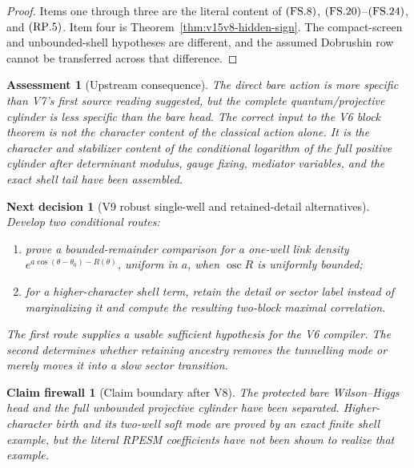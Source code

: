 \documentclass[11pt]{article}
\newtheorem{firewall}[theorem]{Claim firewall}
\newtheorem{decision}[theorem]{Next decision}
\newtheorem{assessment}[theorem]{Assessment}
\theoremstyle{remark}
\begin{document}
\begin{proof}
Items one through three are the literal content of
\({\rm(FS.8)}\), \({\rm(FS.20)}\)--\({\rm(FS.24)}\), and
\({\rm(RP.5)}\).  Item four is
Theorem~\ref{thm:v15v8-hidden-sign}.  The compact-screen and
unbounded-shell hypotheses are different, and the assumed
Dobrushin row cannot be transferred across that difference.
\end{proof}

\begin{assessment}[Upstream consequence]
\label{ass:v15v8-consequence}
The direct bare action is more specific than V7's first source
reading suggested, but the complete quantum/projective cylinder is
less specific than the bare head.  The correct input to the V6
block theorem is not the character content of the classical action
alone.  It is the character and stabilizer content of the
conditional logarithm of the full positive cylinder after
determinant modulus, gauge fixing, mediator variables, and the
exact shell tail have been assembled.
\end{assessment}

\begin{decision}[V9 robust single-well and retained-detail alternatives]
\label{dec:v15v8-next}
Develop two conditional routes:
\begin{enumerate}
\item prove a bounded-remainder comparison for a one-well link
      density
      \(e^{a\cos(\theta-\theta_0)-R(\theta)}\), uniform in
      \(a\), when \(\operatorname{osc}R\) is uniformly bounded;
\item for a higher-character shell term, retain the detail or
      sector label instead of marginalizing it and compute the
      resulting two-block maximal correlation.
\end{enumerate}
The first route supplies a usable sufficient hypothesis for the
V6 compiler.  The second determines whether retaining ancestry
removes the tunnelling mode or merely moves it into a slow sector
transition.
\end{decision}

\begin{firewall}[Claim boundary after V8]
\label{fire:v15v8}
The protected bare Wilson--Higgs head and the full unbounded
projective cylinder have been separated.  Higher-character birth
and its two-well soft mode are proved by an exact finite shell
example, but the literal RPESM coefficients have not been shown to
realize that example.
\end{firewall}
\end{document}
